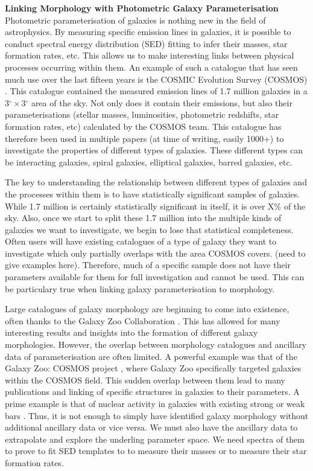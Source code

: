 \documentclass[11pt,usenatbib]{article}
\begin{document}
\vspace{-5mm}
\justification
\vspace{-3mm}
\noindent\textbf{Linking Morphology with Photometric Galaxy Parameterisation} \\
Photometric parameterisation of galaxies is nothing new in the field of astrophysics. By measuring specific emission lines in galaxies, it is possible to conduct spectral energy distribution (SED) fitting to infer their masses, star formation rates, etc. This allows us to make interesting links between physical processes occurring within them. An example of such a catalogue that has seen much use over the last fifteen years is the COSMIC Evolution Survey (COSMOS) \citep{cosmos catalogue}. This catalogue contained the measured emission lines of 1.7 million galaxies in a 3$^{\circ} \times $3$^{\circ}$ area of the sky. Not only does it contain their emissions, but also their parameterisations (stellar masses, luminosities, photometric redshifts, star formation rates, etc) calculated by the COSMOS team. This catalogue has therefore been used in multiple papers (at time of writing, easily 1000+) to investigate the properties of different types of galaxies. These different types can be interacting galaxies, spiral galaxies, elliptical galaxies, barred galaxies, etc.

The key to understanding the relationship between different types of galaxies and the processes within them is to have statistically significant samples of galaxies. While 1.7 million is certainly statistically significant in itself, it is over X\% of the sky. Also, once we start to split these 1.7 million into the multiple kinds of galaxies we want to investigate, we begin to lose that statistical completeness. Often users will have existing catalogues of a type of galaxy they want to investigate which only partially overlaps with the area COSMOS covers. (need to give examples here). Therefore, much of a specific sample does not have their parameters available for them for full investigation and cannot be used. This can be particulary true when linking galaxy parameterisation to morphology.

Large catalogues of galaxy morphology are beginning to come into existence, often thanks to the Galaxy Zoo Collaboration \citep{lintott_08}. This has allowed for many interesting results and insights into the formation of different galaxy morphologies. However, the overlap between morphology catalogues and ancillary data of parameterisation are often limited. A powerful example was that of the Galaxy Zoo: COSMOS project \citep{}, where Galaxy Zoo specifically targeted galaxies within the COSMOS field. This sudden overlap between them lead to many publications and linking of specific structures in galaxies to their parameters. A prime example is that of nuclear activity in galaxies with existing strong or weak bars \citep{papers using cosmos with galaxy zoo}. Thus, it is not enough to simply have identified galaxy morphology without additional ancillary data or vice versa. We must also have the ancillary data to extrapolate and explore the underling parameter space. We need spectra of them to prove to fit SED templates to to measure their masses or to measure their star formation rates. 
\end{document}
